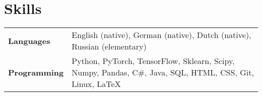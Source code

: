 \documentclass[a4paper,12pt]{article}
\begin{document}
\section{Skills}
\begin{tabularx}{\linewidth}{@{}l X@{}}
\textbf{Languages} & English (native), German (native), Dutch (native), Russian (elementary) \\
\textbf{Programming} & Python, PyTorch, TensorFlow, Sklearn, Scipy, Numpy, Pandas, C\#, Java, SQL, HTML, CSS, Git, Linux, \LaTeX
\end{tabularx}

\vfill
{}
\end{document}
